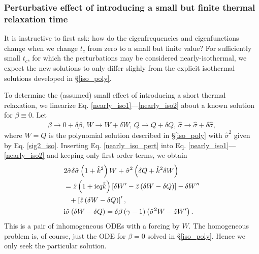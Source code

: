 \subsubsection{Perturbative effect of introducing a small but finite
  thermal relaxation time} 

It is instructive to first ask: how
do the eigenfrequencies and eigenfunctions change when we change
$t_c$ from zero to a small but finite value? For sufficiently small
$t_c$, for which the perturbations may be considered
nearly-isothermal, we expect the new solutions to only differ slighly
from the explicit isothermal solutions developed in \S\ref{iso_poly}. 




To determine the (assumed) small effect of introducing a short thermal
relaxation, we linearize Eq. \ref{nearly_iso1}---\ref{nearly_iso2} about a known
solution for $\beta\equiv0$. Let 
\begin{align}\label{nearly_iso_pert}
  \beta \to 0 + \delta\beta,\, W\to W+\delta W,\, Q \to Q+\delta
  Q,\,\hat{\sigma} \to \hat{\sigma} + \delta\hat{\sigma}, 
\end{align} 
where $W=Q$ is the polynomial solution described in \S\ref{iso_poly}
with $\hat{\sigma}^2$ given by Eq. \ref{sig2_iso}. Inserting
Eq. \ref{nearly_iso_pert} into
Eq. \ref{nearly_iso1}---\ref{nearly_iso2} and keeping only first order
terms, we obtain
\begin{align}
  &2\hat{\sigma}\delta\hat{\sigma}\left(1+\hat{k}^2\right)W +
  \hat{\sigma}^2 \left(\delta Q + \hat{k}^2\delta W\right)\notag\\
  &= \hat{z} \left(1+\mathrm{i}\epsilon q \hat{k}\right)\left[\delta W^\prime -
    \hat{z} \left(\delta W - 
      \delta Q\right)\right] - \delta W^{\prime\prime}\notag\\
  &\phantom{=} + \left[\hat{z} \left(\delta W -
     \delta Q\right)\right]^\prime,\label{nearly_iso3}\\
&\mathrm{i}\hat{\sigma} \left(\delta W - \delta Q\right) =
\delta\beta\left(\gamma-1\right)\left(\hat{\sigma}^2W - \hat{z}W^\prime\right).\label{nearly_iso4}
\end{align}
This is a pair of inhomogeneous ODEs with a forcing by $W$. The
homogeneous problem is, of course, just the ODE for $\beta=0$ solved
in \S\ref{iso_poly}. Hence we only seek the particular solution. 

